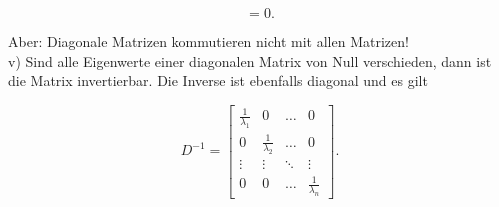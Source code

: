 \documentclass[10pt]{article}
\begin{document}
\begin{equation*}
[D, \tilde{D}]=0 . \tag{6.30}
\end{equation*}


Aber: Diagonale Matrizen kommutieren nicht mit allen Matrizen!\\
v) Sind alle Eigenwerte einer diagonalen Matrix von Null verschieden, dann ist die Matrix invertierbar. Die Inverse ist ebenfalls diagonal und es gilt

\[
D^{-1}=\left[\begin{array}{rrcr}
\frac{1}{\lambda_{1}} & 0 & \ldots & 0  \tag{6.31}\\
0 & \frac{1}{\lambda_{2}} & \ldots & 0 \\
\vdots & \vdots & \ddots & \vdots \\
0 & 0 & \ldots & \frac{1}{\lambda_{n}}
\end{array}\right] .
\]
\end{document}
